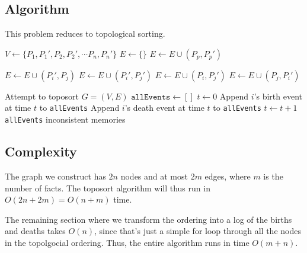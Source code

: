 \documentclass[12pt]{article}
\begin{document}
\subsection*{Algorithm}

This problem reduces to topological sorting.

\begin{algorithmic}[1]
    \State $V \gets \{P_1, P_1', P_2, P_2', \cdots P_n, P_n'\}$
    \State $E \gets \{\}$
        \State $E \gets E \cup (P_p, P_p')$
    \EndFor

    \item[]
            \State $E \gets E \cup (P_i', P_j)$
            \State $E \gets E \cup (P_i', P_j')$
            \State $E \gets E \cup (P_i, P_j')$
            \State $E \gets E \cup (P_j, P_i')$
        \EndIf
    \EndFor

    \item[]
    \State Attempt to toposort $G = (V, E)$
        \State $\texttt{allEvents} \gets []$
        \State $t \gets 0$
                \State Append $i$'s birth event at time $t$ to \texttt{allEvents}
                \State Append $i$'s death event at time $t$ to \texttt{allEvents}
            \EndIf
            \State $t \gets t + 1$
        \EndFor
        \State \Return \texttt{allEvents}
    \Else
        \State \Return inconsistent memories
    \EndIf
\end{algorithmic}

\subsection*{Complexity}

The graph we construct has $2n$ nodes and at most $2m$ edges,
where $m$ is the number of facts.
The toposort algorithm will thus run in $O(2n+2m)=O(n+m)$ time.

The remaining section where we transform the ordering into a
log of the births and deaths takes $O(n)$, since that's just
a simple for loop through all the nodes in the topolgocial ordering.
Thus, the entire algorithm runs in time $O(m+n)$.
\end{document}
